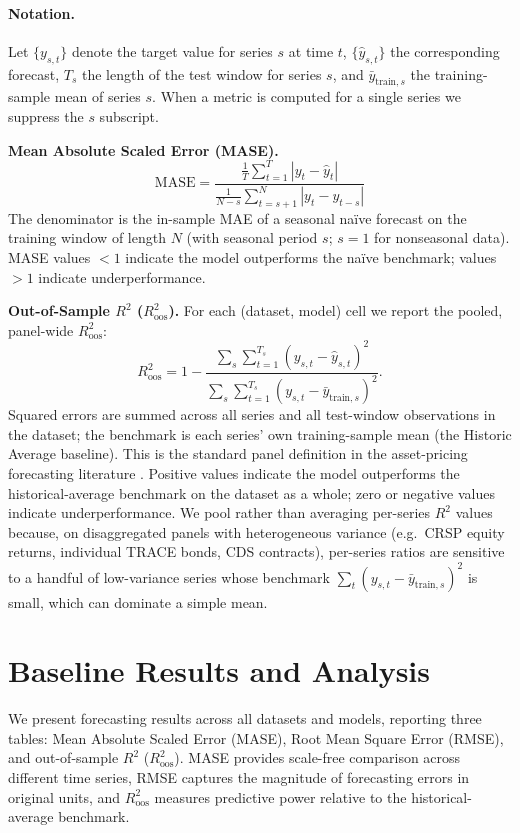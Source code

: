 \documentclass{article}
\begin{document}
\paragraph{Notation.} Let $\{y_{s,t}\}$ denote the target value for series $s$ at time $t$, $\{\hat y_{s,t}\}$ the corresponding forecast, $T_s$ the length of the test window for series $s$, and $\bar{y}_{\text{train},s}$ the training-sample mean of series $s$. When a metric is computed for a single series we suppress the $s$ subscript.

\medskip
\noindent\textbf{Mean Absolute Scaled Error (MASE).}
\[
\mathrm{MASE}=\frac{\frac{1}{T}\sum_{t=1}^T |y_t-\hat y_t|}
{\displaystyle \frac{1}{N-s}\sum_{t=s+1}^{N} |y_t - y_{t-s}|}
\]
The denominator is the in-sample MAE of a seasonal naïve forecast on the training window of length $N$ (with seasonal period $s$; $s{=}1$ for nonseasonal data). MASE values $<1$ indicate the model outperforms the naïve benchmark; values $>1$ indicate underperformance.

\medskip
\noindent\textbf{Out-of-Sample $R^2$ ($R^2_{\text{oos}}$).} For each (dataset, model) cell we report the pooled, panel-wide $R^2_{\text{oos}}$:
\[
R^2_{\text{oos}} = 1 - \frac{\sum_{s}\sum_{t=1}^{T_s} (y_{s,t}-\hat y_{s,t})^2}{\sum_{s}\sum_{t=1}^{T_s} (y_{s,t}-\bar{y}_{\text{train},s})^2}.
\]
Squared errors are summed across all series and all test-window observations in the dataset; the benchmark is each series' own training-sample mean (the Historic Average baseline). This is the standard panel definition in the asset-pricing forecasting literature \citep{Campbell2008,Gu2020}. Positive values indicate the model outperforms the historical-average benchmark on the dataset as a whole; zero or negative values indicate underperformance. We pool rather than averaging per-series $R^2$ values because, on disaggregated panels with heterogeneous variance (e.g.\ CRSP equity returns, individual TRACE bonds, CDS contracts), per-series ratios are sensitive to a handful of low-variance series whose benchmark $\sum_t (y_{s,t}-\bar{y}_{\text{train},s})^2$ is small, which can dominate a simple mean.

\section{Baseline Results and Analysis}
\label{sec:results}


We present forecasting results across all datasets and models, reporting three tables: Mean Absolute Scaled Error (MASE), Root Mean Square Error (RMSE), and out-of-sample $R^2$ ($R^2_{\text{oos}}$). MASE provides scale-free comparison across different time series, RMSE captures the magnitude of forecasting errors in original units, and $R^2_{\text{oos}}$ measures predictive power relative to the historical-average benchmark.
\end{document}
